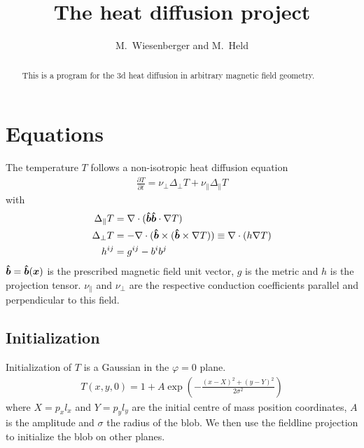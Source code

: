 





\title{The heat diffusion project}
\author{ M.~Wiesenberger and M.~Held}
\maketitle

\begin{abstract}
  This is a program for the 3d heat diffusion in arbitrary magnetic field
  geometry.
  \end{abstract}

\section{Equations}
The temperature $T$ follows a non-isotropic heat diffusion equation
\begin{align}
\frac{\partial T}{\partial t} = \nu_\perp \Delta_\perp T + \nu_\parallel\Delta_\parallel T
\label{eq:temperature}
\end{align}
with
\begin{align}
\Delta_\parallel T &= \nabla\cdot ( \bm{\hat{b}}\bm{\hat{b}}\cdot\nabla T) \\
\Delta_\perp T     &= -\nabla\cdot( \bm{\hat{b}}\times(\bm{\hat{b}}\times \nabla T)) \equiv \nabla\cdot (h \nabla T) \\
h^{ij} &= g^{ij} - b^ib^j
\end{align}
$\bm{\hat{b}} = \bm{\hat{b}}({\boldsymbol{x}})$ is the prescribed magnetic field unit vector, $g$ is the
metric and $h$ is the projection
tensor.
$\nu_\parallel$ and $\nu_\perp$ are the respective conduction
coefficients parallel and perpendicular to this field.


\subsection{Initialization}
Initialization of $T$ is a Gaussian in the $\varphi =0$ plane.
\begin{align}
    T(x,y,0) = 1 + A\exp\left( -\frac{(x-X)^2 + (y-Y)^2}{2\sigma^2}\right)
    \label{}
\end{align}
where $X = p_x l_x$ and $Y=p_yl_y$ are the initial centre of mass position coordinates, $A$ is the amplitude and $\sigma$ the
radius of the blob.
We then use the fieldline projection to initialize the blob on other planes.
